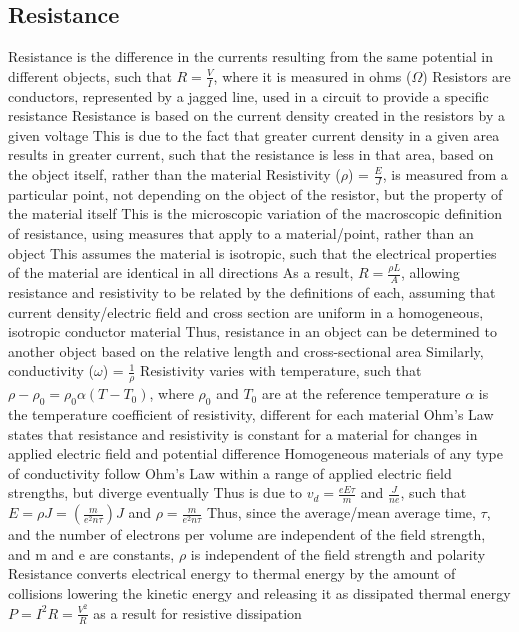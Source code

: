 \documentclass[11 pt, twoside]{article}
\newenvironment{outline*}
{
	\begin{outline}[enumerate]
	}
	{\end{outline}
}
\begin{document}
\subsection{Resistance}
\begin{outline*}
\1 Resistance is the difference in the currents resulting from the same potential in different objects, such that $R = \frac{V}{I}$, where it is measured in ohms ($\Omega$)
\2 Resistors are conductors, represented by a jagged line, used in a circuit to provide a specific resistance
\2 Resistance is based on the current density created in the resistors by a given voltage
\3 This is due to the fact that greater current density in a given area results in greater current, such that the resistance is less in that area, based on the object itself, rather than the material
\1 Resistivity ($\rho$) = $\frac{E}{J}$, is measured from a particular point, not depending on the object of the resistor, but the property of the material itself
\2 This is the microscopic variation of the macroscopic definition of resistance, using measures that apply to a material/point, rather than an object
\2 This assumes the material is isotropic, such that the electrical properties of the material are identical in all directions
\2 As a result, $R = \frac{\rho L}{A}$, allowing resistance and resistivity to be related by the definitions of each, assuming that current density/electric field and cross section are uniform in a homogeneous, isotropic conductor material
\3 Thus, resistance in an object can be determined to another object based on the relative length and cross-sectional area
\2 Similarly, conductivity ($\omega$) = $\frac{1}{\rho}$
\2 Resistivity varies with temperature, such that $\rho - \rho_0 = \rho_0\alpha(T - T_0)$, where $\rho_0$ and $T_0$ are at the reference temperature
\3 $\alpha$ is the temperature coefficient of resistivity, different for each material
\1 Ohm's Law states that resistance and resistivity is constant for a material for changes in applied electric field and potential difference
\2 Homogeneous materials of any type of conductivity follow Ohm's Law within a range of applied electric field strengths, but diverge eventually
\2 Thus is due to $v_d = \frac{eE\tau}{m}$ and $\frac{J}{ne}$, such that $E = \rho J = (\frac{m}{e^2n\tau})J$ and $\rho = \frac{m}{e^2n\tau}$
\3 Thus, since the average/mean average time, $\tau$, and the number of electrons per volume are independent of the field strength, and m and e are constants, $\rho$ is independent of the field strength and polarity
\1 Resistance converts electrical energy to thermal energy by the amount of collisions lowering the kinetic energy and releasing it as dissipated thermal energy
\2 $P = I^2R = \frac{V^2}{R}$ as a result for resistive dissipation
\end{outline*}
\end{document}
